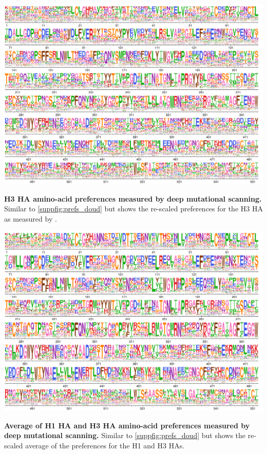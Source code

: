 \documentclass[11pt]{article}
\begin{document}
\begin{suppfig}[H]
\centerline{\includegraphics[width=\textwidth]{figures/prefs_lee}}
\caption{\label{suppfig:prefs_lee}
\textbf{H3 HA amino-acid preferences measured by deep mutational scanning.}
Similar to \ref{suppfig:prefs_doud} but shows the re-scaled preferences for the H3 HA as measured by \citet{lee2018deep}.
 }
\end{suppfig}
\clearpage 

\begin{suppfig}[H]
\centerline{\includegraphics[width=\textwidth]{figures/prefs_average}}
\caption{\label{suppfig:prefs_average}
\textbf{Average of H1 HA  and H3 HA amino-acid preferences measured by deep mutational scanning.}
Similar to \ref{suppfig:prefs_doud} but shows the re-scaled average of the preferences for the H1 and H3 HAs.
}
\end{suppfig}
\clearpage 
\end{document}
